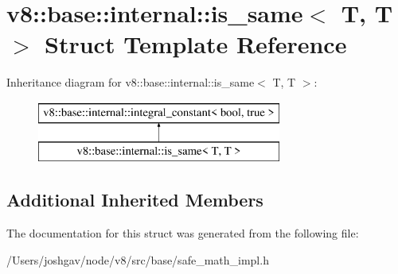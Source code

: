 \hypertarget{structv8_1_1base_1_1internal_1_1is__same_3_01_t_00_01_t_01_4}{}\section{v8\+:\+:base\+:\+:internal\+:\+:is\+\_\+same$<$ T, T $>$ Struct Template Reference}
\label{structv8_1_1base_1_1internal_1_1is__same_3_01_t_00_01_t_01_4}
Inheritance diagram for v8\+:\+:base\+:\+:internal\+:\+:is\+\_\+same$<$ T, T $>$\+:\begin{figure}[H]
\begin{center}
\leavevmode
\includegraphics[height=2.000000cm]{structv8_1_1base_1_1internal_1_1is__same_3_01_t_00_01_t_01_4}
\end{center}
\end{figure}
\subsection*{Additional Inherited Members}


The documentation for this struct was generated from the following file\+:\begin{DoxyCompactItemize}
\item 
/\+Users/joshgav/node/v8/src/base/safe\+\_\+math\+\_\+impl.\+h\end{DoxyCompactItemize}

